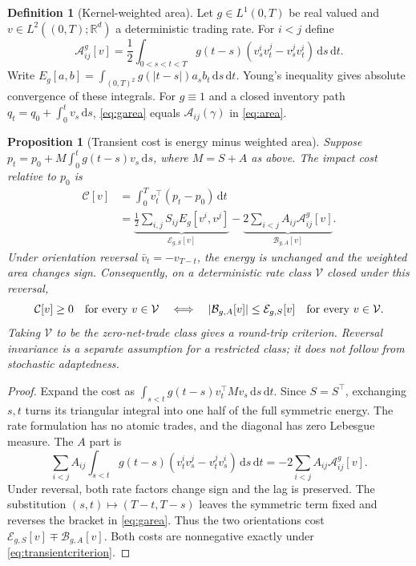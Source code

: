 \documentclass[11pt]{article}
\numberwithin{equation}{section}
\newtheorem{proposition}[theorem]{Proposition}
\theoremstyle{definition}
\newtheorem{definition}[theorem]{Definition}
\theoremstyle{remark}
\newcommand{\R}{\mathbb{R}}
\theoremstyle{definition}
\newcommand{\dd}{\,\mathrm d}
\begin{document}
\begin{definition}[Kernel-weighted area]\label{def:garea}
Let $g\in L^1(0,T)$ be real valued and
$v\in L^2((0,T);\R^d)$ a deterministic trading rate. For $i<j$ define
\begin{equation}\label{eq:garea}
 \mathcal A^g_{ij}[v]=\frac12\int_{0<s<t<T}g(t-s)
       (v_s^iv_t^j-v_s^jv_t^i)\dd s\dd t .
\end{equation}
Write $E_g[a,b]=\int_{(0,T)^2}g(|t-s|)a_sb_t\dd s\dd t$.
Young's inequality gives absolute convergence of these integrals. For
$g\equiv1$ and a closed inventory path
$q_t=q_0+\int_0^tv_s\dd s$, \eqref{eq:garea} equals
$\mathcal A_{ij}(\gamma)$ in \eqref{eq:area}.
\end{definition}

\begin{proposition}[Transient cost is energy minus weighted area]\label{prop:transientsplit}
Suppose $p_t=p_0+M\int_0^tg(t-s)v_s\dd s$, where $M=S+A$ as above.
The impact cost relative to $p_0$ is
\begin{equation}\label{eq:transientsplit}
 \begin{aligned}
 \mathcal C[v]&=\int_0^Tv_t^\top(p_t-p_0)\dd t\\
 &=\underbrace{\frac12\sum_{i,j}S_{ij}E_g[v^i,v^j]}_{\mathcal E_{g,S}[v]}
  -\underbrace{2\sum_{i<j}A_{ij}\mathcal A^g_{ij}[v]}_{\mathcal B_{g,A}[v]} .
 \end{aligned}
\end{equation}
Under orientation reversal $\bar v_t=-v_{T-t}$, the energy is unchanged
and the weighted area changes sign. Consequently, on a deterministic rate
class $\mathcal V$ closed under this reversal,
\begin{equation}\label{eq:transientcriterion}
 \mathcal C[v]\ge0\quad\hbox{for every }v\in\mathcal V
 \quad\Longleftrightarrow\quad
 |\mathcal B_{g,A}[v]|\le\mathcal E_{g,S}[v]
 \quad\hbox{for every }v\in\mathcal V .
\end{equation}
Taking $\mathcal V$ to be the zero-net-trade class gives a round-trip
criterion. Reversal invariance is a separate assumption for a restricted
class; it does not follow from stochastic adaptedness.
\end{proposition}
\begin{proof}
Expand the cost as
$\int_{s<t}g(t-s)v_t^\top Mv_s\dd s\dd t$.
Since $S=S^\top$, exchanging $s,t$ turns its triangular integral into
one half of the full symmetric energy. The rate formulation has no
atomic trades, and the diagonal has zero Lebesgue measure. The $A$ part is
\[
 \sum_{i<j}A_{ij}\int_{s<t}g(t-s)
       (v_t^iv_s^j-v_t^jv_s^i)\dd s\dd t
 =-2\sum_{i<j}A_{ij}\mathcal A^g_{ij}[v].
\]
Under reversal, both rate factors change sign and the lag is preserved.
The substitution $(s,t)\mapsto(T-t,T-s)$ leaves the symmetric term fixed
and reverses the bracket in \eqref{eq:garea}. Thus the two orientations
cost $\mathcal E_{g,S}[v]\mp\mathcal B_{g,A}[v]$. Both costs are
nonnegative exactly under \eqref{eq:transientcriterion}.
\end{proof}
\end{document}
